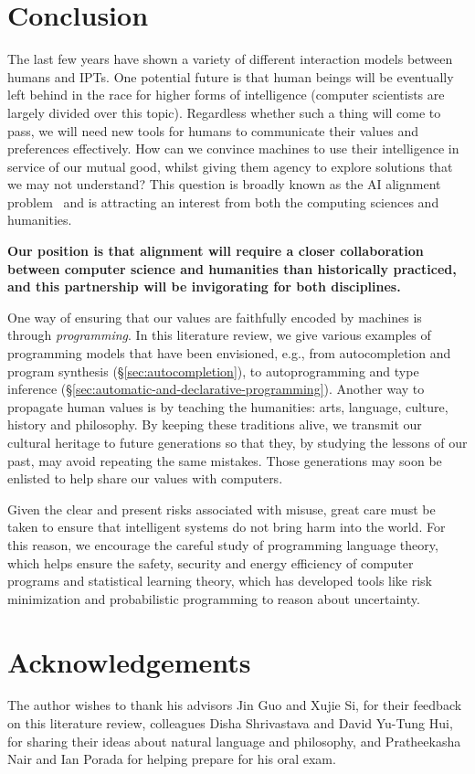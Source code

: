 \documentclass[12pt]{article}
\begin{document}
\section{Conclusion}

The last few years have shown a variety of different interaction models between humans and IPTs. One potential future is that human beings will be eventually left behind in the race for higher forms of intelligence (computer scientists are largely divided over this topic). Regardless whether such a thing will come to pass, we will need new tools for humans to communicate their values and preferences effectively. How can we convince machines to use their intelligence in service of our mutual good, whilst giving them agency to explore solutions that we may not understand? This question is broadly known as the AI alignment problem~\cite{kim2018mimetic, christian2020alignment} and is attracting an interest from both the computing sciences and humanities.

\textbf{Our position is that alignment will require a closer collaboration between computer science and humanities than historically practiced, and this partnership will be invigorating for both disciplines.}

One way of ensuring that our values are faithfully encoded by machines is through \textit{programming}. In this literature review, we give various examples of programming models that have been envisioned, e.g., from autocompletion and program synthesis (\S\ref{sec:autocompletion}), to autoprogramming and type inference (\S\ref{sec:automatic-and-declarative-programming}). Another way to propagate human values is by teaching the humanities: arts, language, culture, history and philosophy. By keeping these traditions alive, we transmit our cultural heritage to future generations so that they, by studying the lessons of our past, may avoid repeating the same mistakes. Those generations may soon be enlisted to help share our values with computers.

Given the clear and present risks associated with misuse, great care must be taken to ensure that intelligent systems do not bring harm into the world. For this reason, we encourage the careful study of programming language theory, which helps ensure the safety, security and energy efficiency of computer programs and statistical learning theory, which has developed tools like risk minimization and probabilistic programming to reason about uncertainty.

\section{Acknowledgements}

The author wishes to thank his advisors Jin Guo and Xujie Si, for their feedback on this literature review, colleagues Disha Shrivastava and David Yu-Tung Hui, for sharing their ideas about natural language and philosophy, and Pratheekasha Nair and Ian Porada for helping prepare for his oral exam.

  
  
\end{document}

